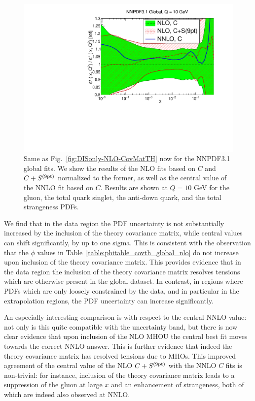 \begin{figure}[t]
\begin{center}
   \includegraphics[scale=0.39]{mhous/plots/xsp-Global-NLO-CovMatTH-EXP-vsTH.pdf}
   \caption{\small Same as Fig.~\ref{fig:DISonly-NLO-CovMatTH}
     now for the NNPDF3.1 global fits.
     We show the results of the NLO fits based on $C$ and $C+S^{\rm (9pt)}$ normalized
     to the former, as well as the central value of the NNLO fit based on $C$.
     Results are shown at $Q=10$ GeV for the gluon, the total quark singlet,
     the anti-down quark, and the total strangeness PDFs.
    \label{fig:Global-NLO-CovMatTH} }
  \end{center}
\end{figure}

We find that in the data region the PDF uncertainty is not substantially 
increased by the inclusion of the theory covariance matrix, while central values
can shift significantly, by up to one sigma.
This is consistent with the observation that the $\phi$ values in
Table~\ref{table:phitable_covth_global_nlo} do not increase upon
inclusion of the theory covariance matrix. This provides evidence that
in the data region the inclusion of the theory covariance matrix
resolves tensions which 
are otherwise present in the global dataset. In contrast, in regions where 
PDFs which are only loosely constrained by the data, and in particular in the extrapolation regions, the PDF uncertainty can increase significantly. 

An especially interesting comparison is with respect to the central NNLO
value: not only is this quite compatible with the uncertainty band,
but there is now clear evidence that upon inclusion of the NLO MHOU 
the central best fit moves towards the correct NNLO
answer. This is further evidence that indeed the theory covariance
matrix has resolved tensions due to MHOs.
This improved agreement of the central value of the NLO $C+S^{(\rm 9pt)}$
with the NNLO $C$ fits is  non-trivial: for instance, inclusion of the
theory covariance matrix leads to
a suppression of the gluon at large $x$ and an enhancement of
strangeness, both of which are indeed also observed at NNLO.

